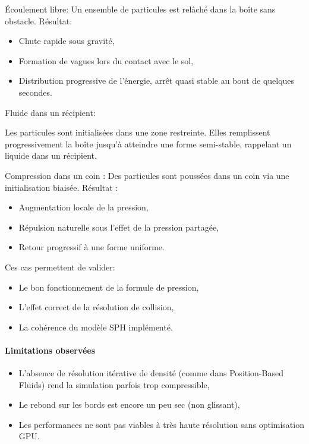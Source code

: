 \documentclass{article}
\begin{document}
Écoulement libre: Un ensemble de particules est relâché dans la boîte sans obstacle. Résultat:

\begin{itemize}
\item Chute rapide sous gravité,
\item Formation de vagues lors du contact avec le sol,
\item Distribution progressive de l'énergie, arrêt quasi stable au bout de quelques secondes.
\end{itemize}

Fluide dans un récipient:

Les particules sont initialisées dans une zone restreinte. Elles remplissent progressivement la boîte jusqu’à atteindre une forme semi-stable, rappelant un liquide dans un récipient.


Compression dans un coin : Des particules sont poussées dans un coin via une initialisation biaisée. Résultat :

\begin{itemize}
\item Augmentation locale de la pression,
\item Répulsion naturelle sous l’effet de la pression partagée,
\item Retour progressif à une forme uniforme.
\end{itemize}

Ces cas permettent de valider:

\begin{itemize}
\item Le bon fonctionnement de la formule de pression,
\item L’effet correct de la résolution de collision,
\item La cohérence du modèle SPH implémenté.
\end{itemize}

\paragraph{Limitations observées}

\begin{itemize}
\item L’absence de résolution itérative de densité (comme dans Position-Based Fluids) rend la simulation parfois trop compressible,
\item Le rebond sur les bords est encore un peu sec (non glissant),
\item Les performances ne sont pas viables à très haute résolution sans optimisation GPU.
\end{itemize}
\end{document}

